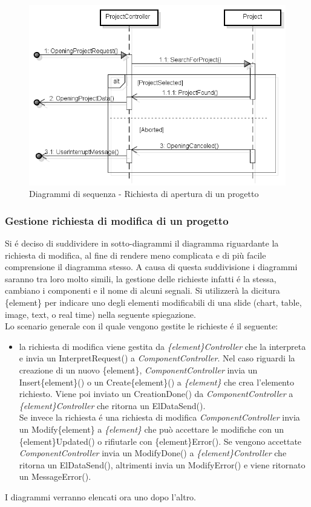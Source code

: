 	\begin{figure}[H]
		\centering
		\includegraphics[scale=0.5]{img/open.png}
		\caption{Diagrammi di sequenza - Richiesta di apertura di un progetto}
	\end{figure}
	
	\newpage
	
	\subsubsection{Gestione richiesta di modifica di un progetto}
	Si é deciso di suddividere in sotto-diagrammi il diagramma riguardante la richiesta di modifica, al fine di rendere meno complicata e di più facile comprensione il diagramma stesso. A causa di questa suddivisione i diagrammi saranno tra loro molto simili, la gestione delle richieste infatti é la stessa, cambiano i componenti e il nome di alcuni segnali. Si utilizzerà la dicitura \{element\} per indicare uno degli elementi modificabili di una \gls{slide} (chart, table, image, text, o \gls{real time}) nella seguente spiegazione. 
	\\Lo scenario generale con il quale vengono gestite le richieste é il seguente:
	\begin{itemize}
		\item[]la richiesta di modifica viene gestita da \textit{\{element\}Controller} che la interpreta e invia un InterpretRequest() a \textit{ComponentController}. Nel caso riguardi la creazione di un nuovo \{element\}, \textit{ComponentController} invia un Insert\{element\}() o un Create\{element\}() a \textit{\{element\}} che crea l'elemento richiesto. Viene poi inviato un CreationDone() da \textit{ComponentController} a \textit{\{element\}Controller} che ritorna un ElDataSend().\\
		Se invece la richiesta é una richiesta di modifica \textit{ComponentController} invia un Modify\{element\} a \textit{\{element\}} che può accettare le modifiche con un \{element\}Updated() o rifiutarle con \{element\}Error(). Se vengono accettate \textit{ComponentController} invia un ModifyDone() a \textit{\{element\}Controller} che ritorna un ElDataSend(), altrimenti invia un ModifyError() e viene ritornato un MessageError().
	\end{itemize}
	I diagrammi verranno elencati ora uno dopo l'altro.
	\newpage
	
